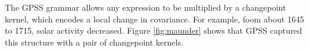 \documentclass{article} %
\begin{document}


The GPSS grammar allows any expression to be multiplied by a changepoint kernel, which encodes a local change in covariance. For example, foom about 1645 to 1715, solar activity decreased.
Figure \ref{fig:maunder} shows that GPSS captured this structure with a pair of changepoint kernels.%


\end{document}
